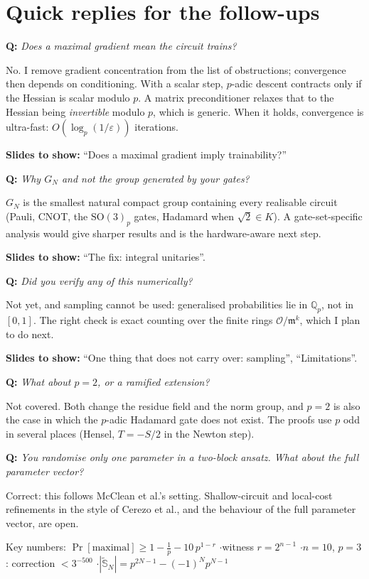 \documentclass[11pt,a4paper]{article}
\newcommand{\Qp}{\mathbb{Q}_p}
\newcommand{\OK}{\mathcal{O}}
\newcommand{\mm}{\mathfrak{m}}
\newcommand{\question}[1]{%
  \par\noindent\colorbox{navy!10}{\parbox{\dimexpr\linewidth-2\fboxsep}{%
    \textbf{\color{navy}Q:} \emph{#1}}}\par}
\newcommand{\slides}[1]{\par\noindent\textbf{\color{ForestGreen}Slides to show:} #1\par}
\begin{document}
\section{Quick replies for the follow-ups}

\question{Does a maximal gradient mean the circuit trains?}
No. I remove gradient concentration from the list of obstructions;
convergence then depends on conditioning. With a scalar step, $p$-adic descent
contracts only if the Hessian is scalar modulo $p$. A matrix preconditioner
relaxes that to the Hessian being \emph{invertible} modulo $p$, which is
generic. When it holds, convergence is ultra-fast: $O(\log_p(1/\varepsilon))$
iterations.
\slides{``Does a maximal gradient imply trainability?''}

\question{Why $G_N$ and not the group generated by your gates?}
$G_N$ is the smallest natural compact group containing every realisable
circuit (Pauli, CNOT, the $\mathrm{SO}(3)_p$ gates, Hadamard when
$\sqrt2\in K$). A gate-set-specific analysis would give sharper results and is
the hardware-aware next step.
\slides{``The fix: integral unitaries''.}

\question{Did you verify any of this numerically?}
Not yet, and sampling cannot be used: generalised probabilities lie in
$\Qp$, not in $[0,1]$. The right check is exact counting over the finite rings
$\OK/\mm^{k}$, which I plan to do next.
\slides{``One thing that does not carry over: sampling'', ``Limitations''.}

\question{What about $p=2$, or a ramified extension?}
Not covered. Both change the residue field and the norm group, and $p=2$ is
also the case in which the $p$-adic Hadamard gate does not exist. The proofs
use $p$ odd in several places (Hensel, $T=-S/2$ in the Newton step).

\question{You randomise only one parameter in a two-block ansatz. What about the full parameter vector?}
Correct: this follows McClean et al.'s setting. Shallow-circuit and local-cost
refinements in the style of Cerezo et al., and the behaviour of the full
parameter vector, are open.

\vfill
\begin{center}
\small Key numbers:\quad
$\Pr[\text{maximal}]\ge1-\tfrac1p-10\,p^{1-r}$
\quad$\cdot$\quad witness $r=2^{n-1}$
\quad$\cdot$\quad $n=10$, $p=3$: correction $<3^{-500}$
\quad$\cdot$\quad $|\widetilde{\mathbb{S}}_N|=p^{2N-1}-(-1)^Np^{N-1}$
\end{center}
\end{document}
